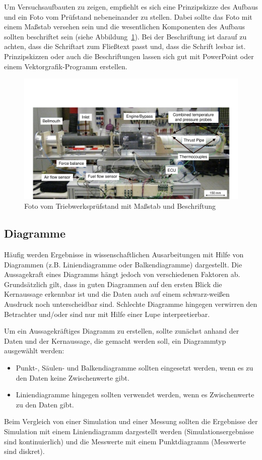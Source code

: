 \documentclass[utf8, a4paper, 11pt, parskip, pointlessnumbers]{scrreprt}
\begin{document}
Um Versuchsaufbauten zu zeigen, empfiehlt es sich eine Prinzipskizze des Aufbaus und ein Foto vom Prüfstand nebeneinander zu stellen. Dabei sollte das Foto mit einem Maßstab versehen sein und die wesentlichen Komponenten des Aufbaus sollten beschriftet sein (siehe Abbildung~\ref{fig:Foto}). Bei der Beschriftung ist darauf zu achten, dass die Schriftart zum Fließtext passt und, dass die Schrift lesbar ist. Prinzipskizzen oder auch die Beschriftungen lassen sich gut mit PowerPoint oder einem Vektorgrafik-Programm erstellen.

\begin{figure}[H]
	\centering
	\includegraphics[trim = 15mm 0mm 15mm 45mm, clip,width=\textwidth]{Abbildungen/Triebwerkpruefstand}
	\caption{Foto vom Triebwerksprüfstand mit Maßstab und Beschriftung}
	\label{fig:Foto}
\end{figure}

\subsection{Diagramme}
Häufig werden Ergebnisse in wissenschaftlichen Ausarbeitungen mit Hilfe von Diagrammen (z.B. Liniendiagramme oder Balkendiagramme) dargestellt. Die Aussagekraft eines Diagramms hängt jedoch von verschiedenen Faktoren ab. Grundsätzlich gilt, dass in guten Diagrammen auf den ersten Blick die Kernaussage erkennbar ist und die Daten auch auf einem schwarz-weißen Ausdruck noch unterscheidbar sind. Schlechte Diagramme hingegen verwirren den Betrachter und/oder sind nur mit Hilfe einer Lupe interpretierbar.

Um ein Aussagekräftiges Diagramm zu erstellen, sollte zunächst anhand der Daten und der Kernaussage, die gemacht werden soll, ein Diagrammtyp ausgewählt werden: 
\begin{itemize}
\item Punkt-, Säulen- und Balkendiagramme sollten eingesetzt werden, wenn es zu den Daten keine Zwischenwerte gibt. 
\item Liniendiagramme hingegen sollten verwendet werden, wenn es Zwischenwerte zu den Daten gibt. 
\end{itemize}
Beim Vergleich von einer Simulation und einer Messung sollten die Ergebnisse der Simulation mit einem Liniendiagramm dargestellt werden (Simulationsergebnisse sind kontinuierlich) und die Messwerte mit einem Punktdiagramm (Messwerte sind diskret).
\end{document}
